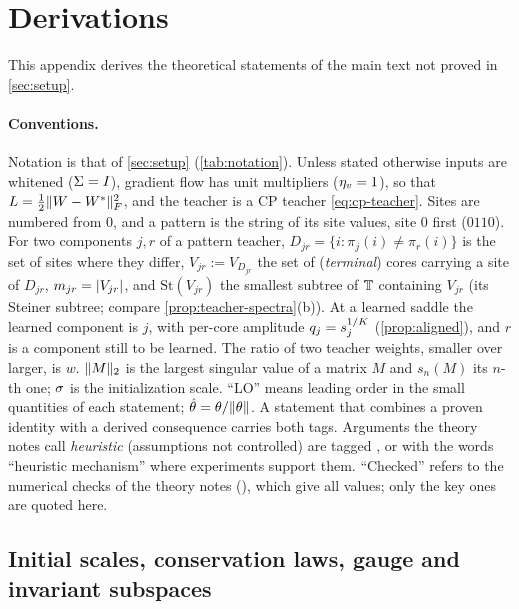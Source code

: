 \section{Derivations}\label{app:derivations}

This appendix derives the theoretical statements of the main text not proved in \cref{sec:setup}.

\paragraph{Conventions.}
Notation is that of \cref{sec:setup} (\cref{tab:notation}). Unless stated otherwise inputs are whitened ($\Sigma=I$),
gradient flow has unit multipliers ($\eta_{v}=1$), so that $L=\tfrac12\lVert W-W^{*}\rVert_{F}^2$, and the
teacher is a CP teacher \eqref{eq:cp-teacher}. Sites are numbered from 0, and a pattern is the string of
its site values, site 0 first ($0110$). For two components $j,r$ of a pattern teacher,
$D_{jr}=\{i:\pi_j(i)\ne\pi_r(i)\}$ is the set of sites where they differ, $V_{jr}:=V_{D_{jr}}$ the set of
(\emph{terminal}) cores carrying a site of $D_{jr}$, $m_{jr}=\lvert V_{jr}\rvert$, and $\mathrm{St}(V_{jr})$ the
smallest subtree of $\mathbb{T}$ containing $V_{jr}$ (its Steiner subtree; compare
\cref{prop:teacher-spectra}(b)). At a learned saddle the learned component is $j$, with per-core
amplitude $q_j=s_{j}^{1/K}$ (\cref{prop:aligned}), and $r$ is a component still to be learned. The ratio of
two teacher weights, smaller over larger, is $w$. $\lVert M\rVert_2$ is the largest singular value of a matrix $M$
and $s_n(M)$ its $n$-th one; $\sigma$ is the initialization scale. ``LO'' means leading order in the small
quantities of each statement; $\hat{\theta}=\theta/\lVert\theta\rVert$. A statement that combines a proven identity with a derived
consequence carries both tags. Arguments the theory notes call \emph{heuristic} (assumptions not
controlled) are tagged \conjecture, or \empirical{} with the words ``heuristic mechanism'' where experiments
support them. ``Checked'' refers to the numerical checks of the theory notes
(), which give all values; only the key ones are quoted here.

\subsection{Initial scales, conservation laws, gauge and invariant subspaces}\label{app:conservation}

